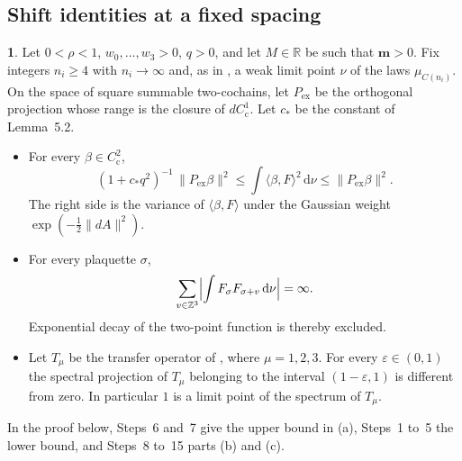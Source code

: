 \documentclass[11pt]{amsart}
\newcommand{\namedhead}{}
\theoremstyle{definition}
\newtheorem*{namedinner}{\namedhead}
\newenvironment{named}[1]{\renewcommand{\namedhead}{#1}\begin{namedinner}}{\end{namedinner}}
\begin{document}
\subsection{Shift identities at a fixed spacing}
\begin{named}{Proposition 5.3}
Let $0<\rho<1$, $w_0,\dots,w_3>0$, $q>0$, and let $M\in\mathbb R$ be such that $\mathbf m>0$.
Fix integers $n_i\ge4$ with $n_i\to\infty$ and, as in \cite[Theorem~1.2]{QEDII}, a weak limit point $\nu$ of the laws $\mu_{C(n_i)}$.
On the space of square summable two-cochains, let $P_{\mathrm{ex}}$ be the orthogonal projection whose range is the closure of $dC^1_{\mathrm c}$.
Let $c_*$ be the constant of Lemma~5.2.
\begin{itemize}
\item[(a)] For every $\beta\in C^2_{\mathrm c}$,
\begin{equation*}
(1+c_*q^2)^{-1}\,\|P_{\mathrm{ex}}\beta\|^2\le\int\langle\beta,F\rangle^2\,\mathrm d\nu\le\|P_{\mathrm{ex}}\beta\|^2.
\end{equation*}
The right side is the variance of $\langle\beta,F\rangle$ under the Gaussian weight $\exp(-\frac12\|dA\|^2)$.
\item[(b)] For every plaquette $\sigma$,
\begin{equation*}
\sum_{v\in\mathbb Z^3}\Bigl|\int F_\sigma F_{\sigma+v}\,\mathrm d\nu\Bigr|=\infty.
\end{equation*}
Exponential decay of the two-point function is thereby excluded.
\item[(c)] Let $T_\mu$ be the transfer operator of \cite[Definition~10.11]{QEDII}, where $\mu=1,2,3$.
For every $\varepsilon\in(0,1)$ the spectral projection of $T_\mu$ belonging to the interval $(1-\varepsilon,1)$ is different from zero.
In particular $1$ is a limit point of the spectrum of $T_\mu$.
\end{itemize}
\end{named}

In the proof below, Steps~6 and~7 give the upper bound in (a), Steps~1 to~5 the lower bound, and Steps~8 to~15 parts (b) and (c).
\end{document}
